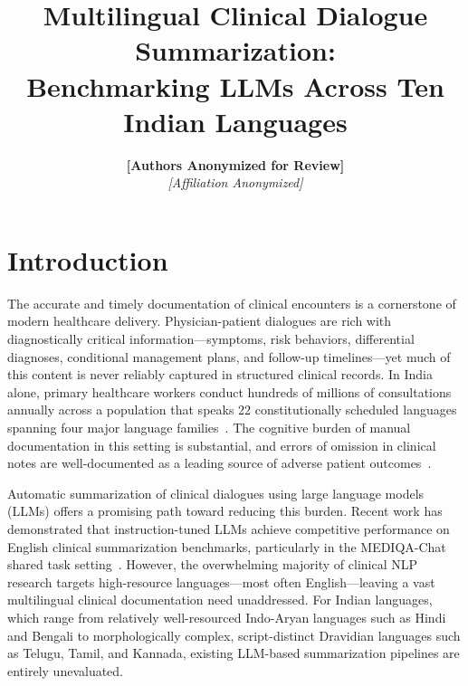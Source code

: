\documentclass[10pt,twocolumn]{article}
\title{\textbf{Multilingual Clinical Dialogue Summarization:\\
Benchmarking LLMs Across Ten Indian Languages}}
\author{
  \textbf{[Authors Anonymized for Review]}\\
  \textit{[Affiliation Anonymized]}
}
\date{}
\begin{document}
\maketitle

\section{Introduction}\label{sec:intro}

The accurate and timely documentation of clinical encounters
is a cornerstone of modern healthcare delivery.
Physician-patient dialogues are rich with diagnostically
critical information---symptoms, risk behaviors, differential
diagnoses, conditional management plans, and follow-up
timelines---yet much of this content is never reliably
captured in structured clinical records.
In India alone, primary healthcare workers conduct hundreds
of millions of consultations annually across a population that
speaks 22 constitutionally scheduled languages spanning four
major language families~\citep{gala2023indictrans}.
The cognitive burden of manual documentation
in this setting is substantial, and errors of omission in
clinical notes are well-documented as a leading source of
adverse patient outcomes~\citep{clus2023framework}.

Automatic summarization of clinical dialogues using
large language models (LLMs) offers a promising path toward
reducing this burden. Recent work has demonstrated that
instruction-tuned LLMs achieve competitive performance on
English clinical summarization benchmarks, particularly in
the MEDIQA-Chat shared task setting~\citep{tang2023gersteinlab,
ben2023mediqa}.
However, the overwhelming majority of clinical NLP research
targets high-resource languages---most often English---leaving
a vast multilingual clinical documentation need unaddressed.
For Indian languages, which range from relatively well-resourced
Indo-Aryan languages such as Hindi and Bengali to
morphologically complex, script-distinct Dravidian languages
such as Telugu, Tamil, and Kannada, existing LLM-based
summarization pipelines are entirely unevaluated.
\end{document}
